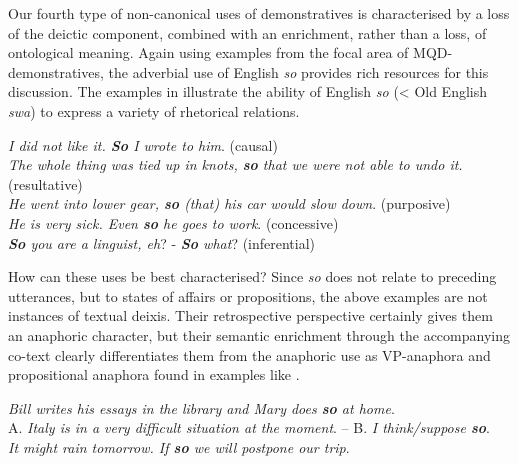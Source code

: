 \documentclass[output=paper,colorlinks,citecolor=brown]{langscibook}
\begin{document}
Our fourth type of non-canonical uses of demonstratives is characterised by a loss of the deictic component, combined with an enrichment, rather than a loss, of ontological meaning. Again using examples from the focal area of MQD-demonstratives, the adverbial use of English \textit{so} provides rich resources for this discussion. The examples in  illustrate the ability of English \textit{so} (< Old English \textit{swa}) to express a variety of rhetorical relations.

\ea\label{ex:koenig:15}
\ea\label{ex:koenig:15a} \textit{I did not like it. \textbf{So} I wrote to him}. (causal)\\

\ex\label{ex:koenig:15b} \textit{The whole thing was tied up in knots, \textbf{so} that we were not able to undo it.} (resultative)\\

\ex\label{ex:koenig:15c} \textit{He went into lower gear, \textbf{so} (that) his car would slow down}. (purposive)\\

\ex\label{ex:koenig:15d} \textit{He is very sick. Even \textbf{so} he goes to work}. (concessive)\\

\ex\label{ex:koenig:15e} \textit{\textbf{So} you are a linguist, eh}? - \textit{\textbf{So} what}? (inferential)\\
\z
\z

How can these uses be best characterised? Since \textit{so} does not relate to preceding utterances, but to states of affairs or propositions, the above examples are not instances of textual deixis. Their retrospective perspective certainly gives them an anaphoric character, but their semantic enrichment through the accompanying co-text clearly differentiates them from the anaphoric use as VP-anaphora and propositional anaphora found in examples like .

\ea\label{ex:koenig:16}
\ea \textit{Bill writes his essays in the library and Mary does \textbf{so} at home}.\\
\ex A. \textit{Italy is in a very difficult situation at the moment}. – \newline B. \textit{I think/suppose \textbf{so}}.\\
\ex \textit{It might rain tomorrow. If \textbf{so} we will postpone our trip}.\\
\z
\z
\end{document}
